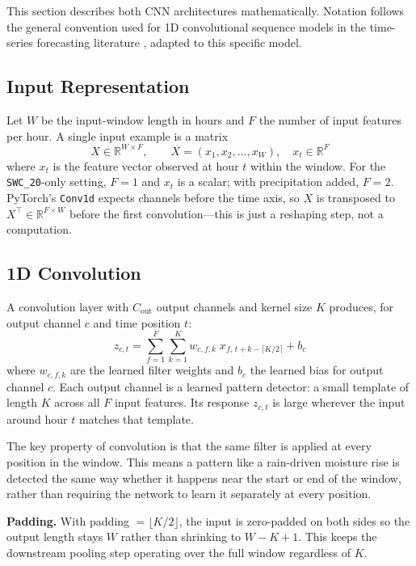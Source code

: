 \documentclass[11pt]{article}
\begin{document}
This section describes both CNN architectures mathematically. Notation follows the
general convention used for 1D convolutional sequence models in the time-series
forecasting literature \cite{borovykh2017conditional, bai2018empirical}, adapted to
this specific model.

\subsection{Input Representation}

Let $W$ be the input-window length in hours and $F$ the number of input features per
hour. A single input example is a matrix
\begin{equation}
    X \in \mathbb{R}^{W \times F}, \qquad
    X = (x_1, x_2, \dots, x_W), \quad x_t \in \mathbb{R}^F
\end{equation}
where $x_t$ is the feature vector observed at hour $t$ within the window. For the
\texttt{SWC\_20}-only setting, $F = 1$ and $x_t$ is a scalar; with precipitation
added, $F = 2$. PyTorch's \texttt{Conv1d} expects channels before the time axis, so
$X$ is transposed to $X^\top \in \mathbb{R}^{F \times W}$ before the first
convolution---this is just a reshaping step, not a computation.

\subsection{1D Convolution}

A convolution layer with $C_{\text{out}}$ output channels and kernel size $K$
produces, for output channel $c$ and time position $t$:
\begin{equation}
    z_{c,t} = \sum_{f=1}^{F} \sum_{k=1}^{K}
    w_{c,f,k} \; x_{f,\, t + k - \lceil K/2 \rceil} + b_c
\end{equation}
where $w_{c,f,k}$ are the learned filter weights and $b_c$ the learned bias for
output channel $c$. Each output channel is a learned pattern detector: a small
template of length $K$ across all $F$ input features. Its response $z_{c,t}$ is
large wherever the input around hour $t$ matches that template.

The key property of convolution is that the same filter is applied at every position
in the window. This means a pattern like a rain-driven moisture rise is detected the
same way whether it happens near the start or end of the window, rather than
requiring the network to learn it separately at every position.

\textbf{Padding.} With padding $= \lfloor K/2 \rfloor$, the input is zero-padded on
both sides so the output length stays $W$ rather than shrinking to $W - K + 1$. This
keeps the downstream pooling step operating over the full window regardless of $K$.
\end{document}
